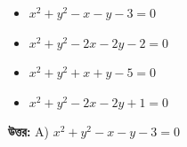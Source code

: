 \documentclass[12pt, a4paper]{article}
\begin{document}
\begin{itemize}[label={}, leftmargin=1cm, itemsep=0.5em]
    \item[\textbf{A)}] $x^2 + y^2 - x - y - 3 = 0$
    \item[\textbf{B)}] $x^2 + y^2 - 2x - 2y - 2 = 0$
    \item[\textbf{C)}] $x^2 + y^2 + x + y - 5 = 0$
    \item[\textbf{D)}] $x^2 + y^2 - 2x - 2y + 1 = 0$
\end{itemize}

\vspace{0.5em}
\begin{tcolorbox}[answerbox]
    \textbf{\color{success} উত্তর:} A) $x^2 + y^2 - x - y - 3 = 0$
\end{tcolorbox}
\vspace{1em}
\end{document}

